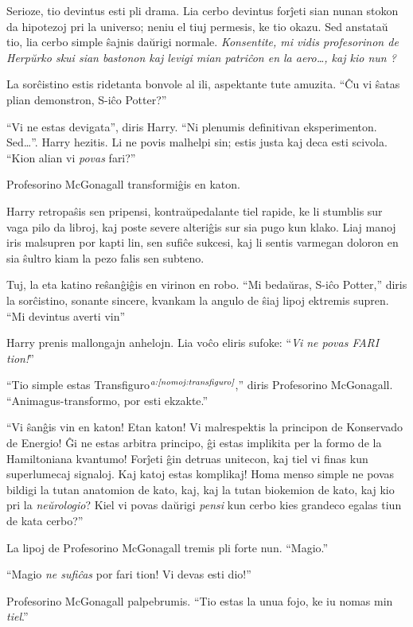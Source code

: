 Serioze, tio devintus esti pli drama. Lia cerbo devintus forĵeti sian nunan
stokon da hipotezoj pri la universo; neniu el tiuj permesis, ke tio okazu. Sed
anstataŭ tio, lia cerbo simple ŝajnis daŭrigi normale. \emph{Konsentite, mi
vidis profesorinon de Herpŭrko skui sian bastonon kaj levigi mian patriĉon en la
aero\ldots{}, kaj kio nun ?}

La sorĉistino estis ridetanta bonvole al ili, aspektante tute amuzita. ``Ĉu vi
ŝatas plian demonstron, S-iĉo Potter?''

``Vi ne estas devigata'', diris Harry. ``Ni plenumis definitivan eksperimenton.
Sed\ldots''. Harry hezitis. Li ne povis malhelpi sin; estis justa kaj deca esti
scivola. ``Kion alian vi \emph{povas} fari?''

Profesorino McGonagall transformiĝis en katon.

Harry retropaŝis sen pripensi, kontraŭpedalante tiel rapide, ke li stumblis sur
vaga pilo da libroj, kaj poste severe alteriĝis sur sia pugo kun klako. Liaj
manoj iris malsupren por kapti lin, sen sufiĉe sukcesi, kaj li sentis varmegan
doloron en sia ŝultro kiam la pezo falis sen subteno.

Tuj, la eta katino reŝanĝiĝis en virinon en robo. ``Mi bedaŭras, S-iĉo Potter,''
diris la sorĉistino, sonante sincere, kvankam la angulo de ŝiaj lipoj ektremis
supren. ``Mi devintus averti vin''

Harry prenis mallongajn anhelojn. Lia voĉo eliris sufoke: ``\emph{Vi ne povas FARI tion!}''

``Tio simple estas Transfiguro$^{\textit{a:\ref{nomoj:transfiguro}}}$,'' diris
Profesorino McGonagall. ``Animagus-transformo, por esti ekzakte.''

``Vi ŝanĝis vin en katon! Etan katon! Vi malrespektis la principon de Konservado
de Energio! Ĝi ne estas arbitra principo, ĝi estas implikita per la formo de la
Hamiltoniana kvantumo! Forĵeti ĝin detruas unitecon, kaj tiel vi finas kun
superlumecaj signaloj. Kaj katoj estas komplikaj! Homa menso simple ne povas
bildigi la tutan anatomion de kato, kaj, kaj la tutan biokemion de kato, kaj kio
pri la \emph{neŭrologio}? Kiel vi povas daŭrigi \emph{pensi} kun cerbo kies
grandeco egalas tiun de kata cerbo?''

La lipoj de Profesorino McGonagall tremis pli forte nun. ``Magio.''

``Magio \emph{ne sufiĉas} por fari tion! Vi devas esti dio!''

Profesorino McGonagall palpebrumis. ``Tio estas la unua fojo, ke iu nomas min \emph{tiel}.''

